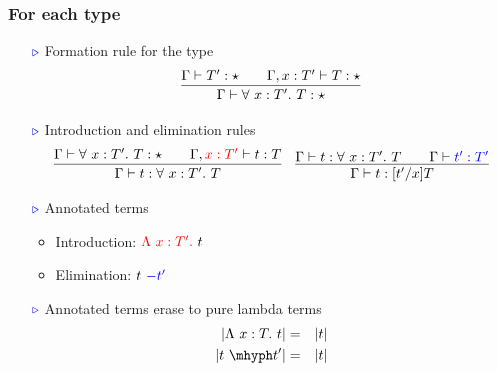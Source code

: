 \documentclass[11pt]{beamer}
\newcommand{\myb}[0]{\ensuremath{\textcolor{blue}{\triangleright}}}
\begin{document}
\begin{frame}
  \frametitle{For each type}

  \begin{itemize}
  \item[$\myb$] Formation rule for the type
{\small
    \[
    \infer{\Gamma\vdash \forall\ x : T'.\ T : \star}{\Gamma\vdash T':\star \qquad \Gamma,x:T'\vdash T : \star}
    \]
}

\vspace{-.5cm}

  \item[$\myb$] Introduction and elimination rules
{\small
    \[
    \begin{array}{ll}
      \infer{\Gamma \vdash t : \forall\ x : T'.\ T}{\Gamma \vdash \forall\ x : T' .\ T : \star \qquad \Gamma, {\color{red}x : T'} \vdash t : T} &
    \infer{\Gamma\vdash t : [t'/x]T}{\Gamma \vdash t : \forall\ x : T'.\ T \qquad \Gamma \vdash {\color{blue}t' : T'}}      
    \end{array}
    \]
}
     
\vspace{-.25cm}

  \item[$\myb$] Annotated terms

    \begin{itemize}
    \item Introduction: ${\color{red}\Lambda\ x : T'.}\ t$
    \item Elimination: $t\ {\color{blue}-t'}$
    \end{itemize}

\vspace{.2cm}

  \item[$\myb$] Annotated terms erase to pure lambda terms
    \begin{eqnarray*}
      |\Lambda\ x : T.\ t| & = & |t| \\
      |t\ \mhyph t'| & = & |t|
    \end{eqnarray*}
  \end{itemize}
\end{frame}
\end{document}
